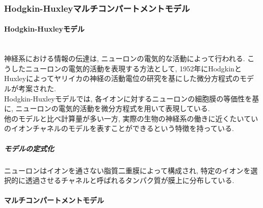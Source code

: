 \subsubsection{Hodgkin-Huxleyマルチコンパートメントモデル}
\paragraph{Hodgkin-Huxleyモデル}~\\
神経系における情報の伝達は, ニューロンの電気的な活動によって行われる.
こうしたニューロンの電気的活動を表現する方法として,
1952年にHodgkinとHuxleyによってヤリイカの神経の活動電位の研究を基にした微分方程式のモデルが考案された.\\
Hodgkin-Huxleyモデルでは, 各イオンに対するニューロンの細胞膜の等価性を基に, ニューロンの電気的活動を微分方程式を用いて表現している.\\
他のモデルと比べ計算量が多い一方, 実際の生物の神経系の働きに近くたいていのイオンチャネルのモデルを表すことができるという特徴を持っている.\\

\subparagraph{モデルの定式化}
ニューロンはイオンを通さない脂質二重膜によって構成され, 特定のイオンを選択的に透過させるチャネルと呼ばれるタンパク質が膜上に分布している.

\paragraph{マルチコンパートメントモデル}
